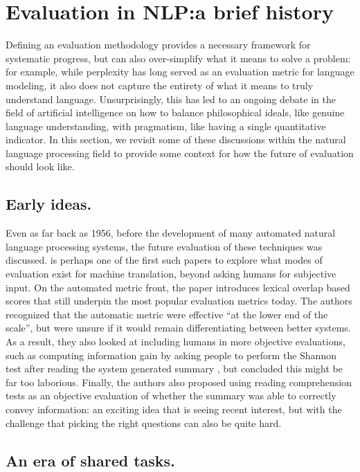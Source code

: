 \section{\label{sec:setup:history}Evaluation in NLP:\@ a brief history}

Defining an evaluation methodology provides a necessary framework for systematic progress, but can also over-simplify what it means to solve a problem: for example, while perplexity has long served as an evaluation metric for language modeling, it also does not capture the entirety of what it means to truly understand language.
Unsurprisingly, this has led to an ongoing debate in the field of artificial intelligence on how to balance philosophical ideals, like genuine language understanding, with pragmatism, like having a single quantitative indicator.
In this section, we revisit some of these discussions within the natural language processing field to provide some context for how the future of evaluation should look like.

\subsection{Early ideas.}

Even as far back as 1956, before the development of many automated natural language processing systems, the future evaluation of these techniques was discussed.
\citet{miller1956psychological} is perhaps one of the first such papers to explore what modes of evaluation exist for machine translation, beyond asking humans for subjective input.
On the automated metric front, the paper introduces lexical overlap based scores that still underpin the most popular evaluation metrics today.
The authors recognized that the automatic metric were effective ``at the lower end of the scale'', but were unsure if it would remain differentiating between better systems.
As a result, they also looked at including humans in more objective evaluations, such as computing information gain by asking people to perform the Shannon test after reading the system generated summary , but concluded this might be far too laborious.
Finally, the authors also proposed using reading comprehension tests as an objective evaluation of whether the summary was able to correctly convey information: an exciting idea that is seeing recent interest, but with the challenge that picking the right questions can also be quite hard.

\subsection{An era of shared tasks.}

